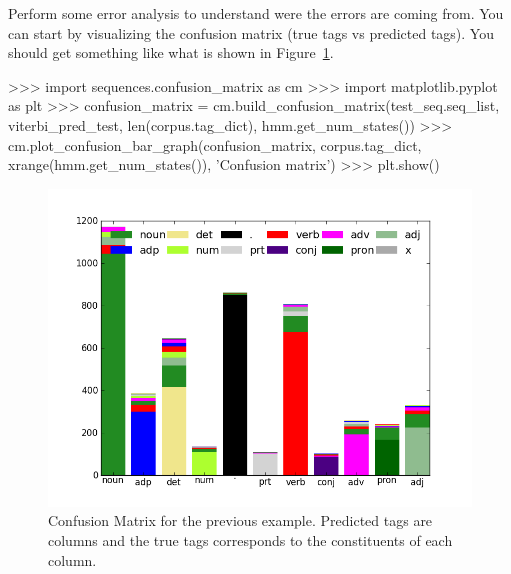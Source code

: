 \begin{exercise}
Perform some error analysis to understand were the errors are coming
from. You can start by visualizing the confusion matrix (true tags vs
predicted tags). You should get something like what is shown in Figure~\ref{fig:cmuns}.

\begin{python}
>>> import sequences.confusion_matrix as cm
>>> import matplotlib.pyplot as plt
>>> confusion_matrix = cm.build_confusion_matrix(test_seq.seq_list, viterbi_pred_test, len(corpus.tag_dict), hmm.get_num_states())
>>> cm.plot_confusion_bar_graph(confusion_matrix, corpus.tag_dict, xrange(hmm.get_num_states()), 'Confusion matrix')
>>> plt.show()
\end{python}

\begin{figure}[h!]
\centering
\includegraphics[scale=.4]{figs/sequences/cm_sup.png}
\caption{\label{fig:cmuns} Confusion Matrix for the previous
  example. Predicted tags are columns and the true tags corresponds to
  the constituents of each column.}
\end{figure}

\end{exercise}


%
%



